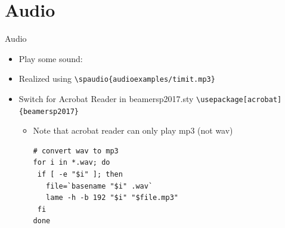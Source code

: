 \section{Audio}


\begin{frame}[c, fragile]{Audio}
    \begin{itemize}
        \item Play some sound:  
        \item Realized using \verb|\spaudio{audioexamples/timit.mp3}|
        \item Switch for Acrobat Reader in beamersp2017.sty \verb|\usepackage[acrobat]{beamersp2017}|
        \begin{itemize}
         \item Note that acrobat reader can only play mp3 (not wav)
         \begin{verbatim}
# convert wav to mp3
for i in *.wav; do
 if [ -e "$i" ]; then
   file=`basename "$i" .wav`
   lame -h -b 192 "$i" "$file.mp3"
 fi
done
\end{verbatim}

        \end{itemize}

    \end{itemize}
\end{frame}
